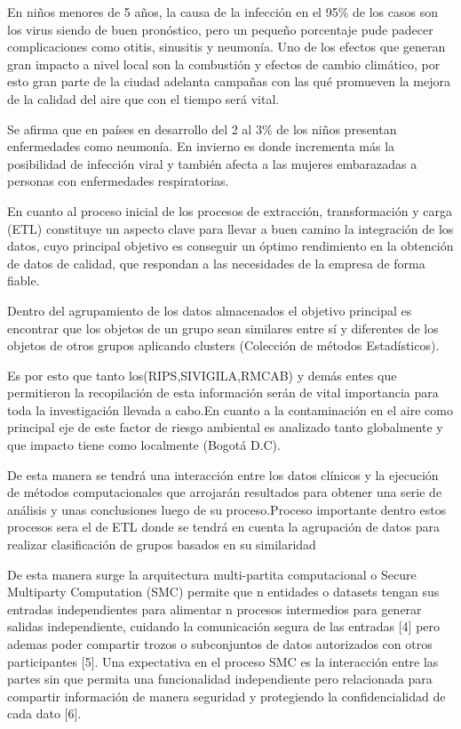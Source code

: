 \documentclass[a4paper, 11pt, oneside]{article}
\theoremstyle{definition}
\theoremstyle{remark}
\begin{document}
En niños menores de 5 años, la causa de la infección en el  95\% de los casos son los virus siendo de buen pronóstico, pero un pequeño porcentaje pude padecer complicaciones como  otitis, sinusitis y neumonía. Uno de los efectos que generan gran impacto a nivel local son  la combustión y efectos de cambio climático, por esto  gran parte de la ciudad adelanta campañas con las qué promueven la mejora de la calidad del aire que con el tiempo será vital.

Se afirma que en países en desarrollo del 2 al 3\% de los niños presentan enfermedades como neumonía. En invierno es donde incrementa más la posibilidad de infección viral y  también afecta a las mujeres embarazadas a personas con enfermedades respiratorias.

En cuanto al proceso inicial de los procesos de extracción, transformación y carga (ETL) constituye un aspecto clave para llevar a buen camino la integración de los datos, cuyo principal objetivo es conseguir un óptimo rendimiento en la obtención de datos de calidad, que respondan a las necesidades de la empresa de forma fiable.

Dentro del agrupamiento de los datos almacenados el objetivo principal es encontrar que los objetos de un grupo sean similares entre sí y diferentes de los objetos de otros grupos aplicando clusters (Colección de métodos Estadísticos).

Es por esto que tanto los(RIPS,SIVIGILA,RMCAB) y demás entes que permitieron la recopilación de esta información serán de vital importancia para toda la investigación llevada a cabo.En cuanto a la contaminación en el aire como principal eje de este factor de riesgo ambiental es analizado tanto globalmente y que impacto tiene como localmente (Bogotá D.C).

De esta manera se tendrá una interacción entre los datos clínicos y la ejecución de métodos computacionales que arrojarán resultados para obtener una serie de análisis y unas conclusiones luego de su proceso.Proceso importante dentro estos procesos sera el de ETL donde se tendrá en cuenta la agrupación de datos para realizar clasificación de grupos  basados en su similaridad 

De esta manera surge la arquitectura multi-partita computacional o  Secure Multiparty Computation (SMC) permite que n entidades o datasets tengan sus entradas independientes para alimentar n procesos intermedios para generar salidas independiente, cuidando la comunicación segura de las entradas [4] pero ademas poder compartir trozos o subconjuntos de datos autorizados con otros participantes  [5]. Una expectativa en el proceso SMC es la interacción entre las partes sin que permita una funcionalidad independiente pero relacionada para compartir información de manera seguridad y protegiendo la confidencialidad de cada dato [6].  
\end{document}
